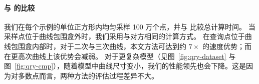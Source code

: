 
\paragraph{与 \cite{Spainhour2024RobustCQ} 的比较}
我们在每个示例的单位正方形内均匀采样 100 万个点，并与 \cite{Spainhour2024RobustCQ} 比较总计算时间。
当采样点位于曲线包围盒外时，我们采用与对方相同的计算方式。
在查询点位于曲线包围盒内部时，对于二次与三次曲线，本文方法可达到约 $7\times$ 的速度优势；而在更高次曲线上该优势会减弱。
对于更复杂模型（见图~\ref{fig:qry-dataset} 与图~\ref{fig:qry-cmp}），随着模型中曲线尺寸变小，我们的性能领先也会下降。这是因为对多数点而言，两种方法的评估过程差异不大。
